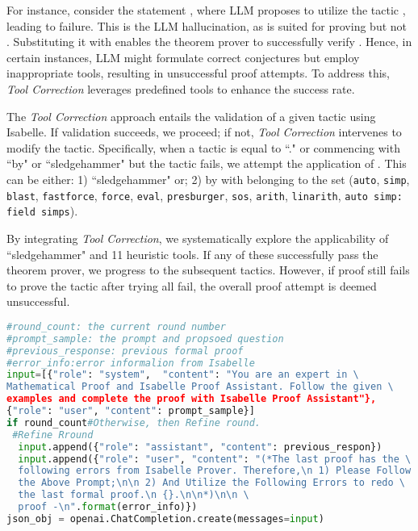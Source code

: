 \documentclass{article} \usepackage{iclr2024_conference,times}
\def\methodOneFull{\textit{Tool Correction}\xspace}
\def\methodTwoFull{\textit{Conjecture Correction}\xspace}
\begin{document}
For instance, consider the statement , where LLM proposes to utilize the tactic , leading to failure. This is the LLM hallucination, as  is suited for proving  but not . Substituting it with  enables the theorem prover to successfully verify . Hence, in certain instances, LLM might formulate correct conjectures but employ inappropriate tools, resulting in unsuccessful proof attempts. To address this, \methodOneFull leverages predefined tools to enhance the success rate.

The \methodOneFull approach entails the validation of a given tactic  using Isabelle. If validation succeeds, we proceed; if not, \methodOneFull intervenes to modify the tactic. Specifically, when a tactic is equal to ``." or commencing with ``by" or ``sledgehammer" but the tactic fails, we attempt the application of . This  can be either: 1) ``sledgehammer" or; 2) by  with  belonging to the set {(\texttt{auto}, \texttt{simp}, \texttt{blast}, \texttt{fastforce}, \texttt{force}, \texttt{eval}, \texttt{presburger}, \texttt{sos}, \texttt{arith}, \texttt{linarith}, \texttt{auto simp: field simps})}.

By integrating \methodOneFull, we systematically explore the applicability of ``sledgehammer" and 11 heuristic tools. If any of these successfully pass the theorem prover, we progress to the subsequent tactics. However, if proof still fails to prove the tactic after trying all  fail, the overall proof attempt is deemed unsuccessful.
\begin{algorithm}[t]
\caption{Pseudocode of \methodTwoFull in a Python-like style.}
\label{alg:chat}
\small


\begin{lstlisting}[language=python]
#round_count: the current round number
#prompt_sample: the prompt and propsoed question
#previous_response: previous formal proof
#error_info:error informalion from Isabelle
input=[{"role": "system",  "content": "You are an expert in \
Mathematical Proof and Isabelle Proof Assistant. Follow the given \ 
examples and complete the proof with Isabelle Proof Assistant"},
{"role": "user", "content": prompt_sample}]
if round_count#Otherwise, then Refine round.
 #Refine Rround
  input.append({"role": "assistant", "content": previous_respon})
  input.append({"role": "user", "content": "(*The last proof has the \
  following errors from Isabelle Prover. Therefore,\n 1) Please Follow  \
  the Above Prompt;\n\n 2) And Utilize the Following Errors to redo \
  the last formal proof.\n {}.\n\n*)\n\n \
  proof -\n".format(error_info)})
json_obj = openai.ChatCompletion.create(messages=input)
\end{lstlisting}
\end{algorithm}
\end{document}

